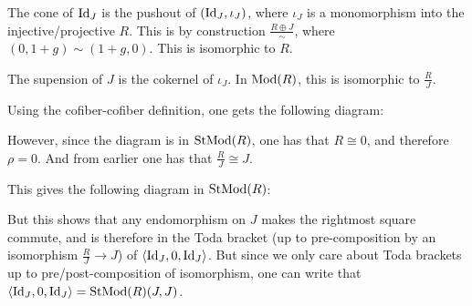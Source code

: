 The cone of \( \operatorname{Id}_J \) is the pushout of \( (\operatorname{Id}_J, \iota_J) \), where \( \iota_J \) is a monomorphism into the injective/projective \( R \). This is by construction \( \frac{R \oplus J}{\sim} \), where \( (0, 1+g) \sim (1+g, 0) \). This is isomorphic to \( R \). \sloppy

The supension of \( J \) is the cokernel of \( \iota_J \). In \( \operatorname{Mod}(R) \), this is isomorphic to \( \frac{R}{J} \).

Using the cofiber-cofiber definition, one gets the following diagram:

\begin{center}
\end{center}

However, since the diagram is in \( \operatorname{StMod}(R) \), one has that \( R \cong 0 \), and therefore \( \rho = 0 \). And from earlier one has that \( \frac{R}{J} \cong J \).

This gives the following diagram in \( \operatorname{StMod}(R) \):

\begin{center}
\end{center}

But this shows that any endomorphism on \( J \) makes the rightmost square commute, and is therefore in the Toda bracket (up to pre-composition by an isomorphism \( \frac{R}{J} \to J \)) of \( \langle \operatorname{Id}_J, 0, \operatorname{Id}_J \rangle \). But since we only care about Toda brackets up to pre/post-composition of isomorphism, one can write that \( \langle \operatorname{Id}_J, 0, \operatorname{Id}_J \rangle = \operatorname{StMod}(R)(J, J) \). \sloppy

